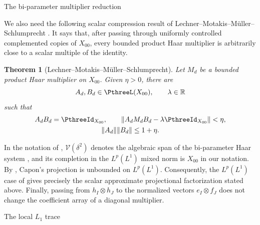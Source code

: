 \documentclass[11pt,reqno]{amsart}
\makeatletter
\theoremstyle{plain}
\newtheorem{theorem}{Theorem}[section]
\theoremstyle{definition}
\newcounter{problempaper}
\newenvironment{problempaperbody}{%
  \setcounter{subsection}{0}%
  \setcounter{subsubsection}{0}%
  \setcounter{paragraph}{0}%
  \renewcommand{\thesubsection}{\arabic{subsection}}%
  \renewcommand{\thesubsubsection}{\thesubsection.\arabic{subsubsection}}%
  \renewcommand{\theparagraph}{\thesubsubsection.\arabic{paragraph}}%
  \let\problem@outersection\section
  \let\problem@outersubsection\subsection
  \let\problem@outersubsubsection\subsubsection
  \let\problem@outerparagraph\paragraph
  \let\section\problem@papersection
  \let\subsection\problem@papersubsection
  \let\subsubsection\problem@papersubsubsection
}{%
  \let\section\problem@outersection
  \let\subsection\problem@outersubsection
  \let\subsubsection\problem@outersubsubsection
  \let\paragraph\problem@outerparagraph
}
\newcommand{\problem@target}[2]{%
  \hypertarget{problem-\theproblempaper-#1-#2}{}%
}
\newcommand{\problem@paperheading}[3]{%
  \par\bigskip
  \problem@target{#1}{#2}%
  \noindent{\large\bfseries #2.\quad #3\par}%
  \nobreak\smallskip
}
\newcommand{\problem@papersubheading}[3]{%
  \par\medskip
  \problem@target{#1}{#2}%
  \noindent{\normalsize\bfseries #2.\quad #3\par}%
  \nobreak\smallskip
}
\newcommand{\problem@papersubsubheading}[3]{%
  \par\smallskip
  \problem@target{#1}{#2}%
  \noindent{\normalsize\itshape #2.\quad #3.\ }%
}
\def\problem@papersection{%
  \@ifstar{\problem@papersectionstar}{\problem@papersectionnostar}%
}
\def\problem@papersectionstar#1{%
  \par\bigskip\noindent{\large\bfseries #1\par}\nobreak\smallskip
}
\def\problem@papersectionnostar#1{%
  \refstepcounter{subsection}%
  \setcounter{subsubsection}{0}%
  \setcounter{paragraph}{0}%
  \problem@paperheading{section}{\thesubsection}{#1}%
  \problem@writecontentsline{section}{\thesubsection}{#1}%
}
\def\problem@papersubsection{%
  \@ifstar{\problem@papersubsectionstar}{\problem@papersubsectionnostar}%
}
\def\problem@papersubsectionstar#1{%
  \par\medskip\noindent{\normalsize\bfseries #1\par}\nobreak\smallskip
}
\def\problem@papersubsectionnostar#1{%
  \refstepcounter{subsubsection}%
  \setcounter{paragraph}{0}%
  \problem@papersubheading{subsection}{\thesubsubsection}{#1}%
  \problem@writecontentsline{subsection}{\thesubsubsection}{#1}%
}
\def\problem@papersubsubsection{%
  \@ifstar{\problem@papersubsubsectionstar}{\problem@papersubsubsectionnostar}%
}
\def\problem@papersubsubsectionstar#1{%
  \par\smallskip\noindent{\normalsize\itshape #1.\ }%
}
\def\problem@papersubsubsectionnostar#1{%
  \refstepcounter{paragraph}%
  \problem@papersubsubheading{subsubsection}{\theparagraph}{#1}%
  \problem@writecontentsline{subsubsection}{\theparagraph}{#1}%
}
\newcommand{\problem@writecontentsline}[3]{%
  \begingroup
  \protected@write\@auxout{}{%
    \string\problemcontentsentry{\theproblempaper}{#1}{#2}{#3}{\thepage}%
  }%
  \endgroup
}
\newcommand{\problemcontentsentry}[5]{%
  \@ifundefined{problemcontents@#1}{%
    \expandafter\gdef\csname problemcontents@#1\endcsname{}%
  }{}%
  \expandafter\g@addto@macro\csname problemcontents@#1\endcsname{%
    \problemcontentsline{#1}{#2}{#3}{#4}{#5}%
  }%
}
\newcommand{\problemcontentslink}[4]{%
  \hyperlink{problem-#1-#2-#3}{#4}%
}
\newcommand{\problemcontentsline}[5]{%
  \ifstrequal{#2}{section}{%
    \par\noindent
    \problemcontentslink{#1}{#2}{#3}{\makebox[2.5em][l]{#3}#4}%
    \nobreak\dotfill
    \problemcontentslink{#1}{#2}{#3}{#5}\par
  }{%
    \ifstrequal{#2}{subsection}{%
      \par\noindent\hspace*{1.5em}%
      \problemcontentslink{#1}{#2}{#3}{\makebox[3.5em][l]{#3}#4}%
      \nobreak\dotfill
      \problemcontentslink{#1}{#2}{#3}{#5}\par
    }{%
      \par\noindent\hspace*{3em}%
      \problemcontentslink{#1}{#2}{#3}{\makebox[4.5em][l]{#3}#4}%
      \nobreak\dotfill
      \problemcontentslink{#1}{#2}{#3}{#5}\par
    }%
  }%
}
\makeatother
\begin{document}
\begin{problempaperbody}
\subsection{The bi-parameter multiplier reduction}
\label{p3:sec:lmms-result}

We also need the following scalar compression result of Lechner--Motakis--M\"uller--Schlumprecht \cite[Theorem~2.3]{LechnerMotakisMullerSchlumprecht2024}. It says that, after passing through uniformly controlled complemented copies of $X_{00}$, every bounded product Haar multiplier is arbitrarily close to a scalar multiple of the identity.

\begin{theorem}[Lechner--Motakis--M\"uller--Schlumprecht]
\label{p3:thm:lmms}
Let $M_d$ be a bounded product Haar multiplier on $X_{00}$. Given $\eta>0$, there are
\begin{equation*}
        A_d,B_d\in\PthreeL(X_{00}),\qquad \lambda\in\mathbb R
\end{equation*}
such that
\begin{equation*}
\begin{gathered}
        A_dB_d=\PthreeId_{X_{00}}, \qquad
        \|A_d M_d B_d-\lambda\PthreeId_{X_{00}}\|<\eta,\\
        \|A_d\|\|B_d\|\leq 1+\eta .
\end{gathered}
\end{equation*}
\end{theorem}

In the notation of \cite{LechnerMotakisMullerSchlumprecht2024}, $\mathcal V(\delta^2)$ denotes the algebraic span of the bi-parameter Haar system \cite[Notation~2.1(e)]{LechnerMotakisMullerSchlumprecht2024}, and its completion in the $L^p(L^1)$ mixed norm is $X_{00}$ in our notation. By \cite[Theorem~2.10]{LechnerMotakisMullerSchlumprecht2024}, Capon's projection \cite{Capon1983} is unbounded on $L^p(L^1)$. Consequently, the $L^p(L^1)$ case of \cite[Definition~2.2(b),(c) and Theorem~2.3]{LechnerMotakisMullerSchlumprecht2024} gives precisely the scalar approximate projectional factorization stated above. Finally, passing from $h_I\otimes h_J$ to the normalized vectors $e_I\otimes f_J$ does not change the coefficient array of a diagonal multiplier.

\section{The local $L_1$ trace}
\label{p3:sec:local-trace}


\end{problempaperbody}
\end{document}
